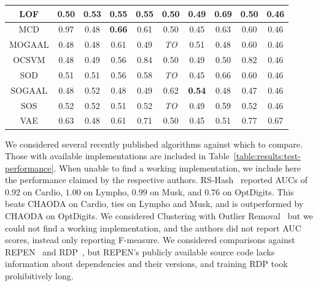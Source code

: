 \begin{table}[!t]
\begin{center}
\begin{small}
\begin{sc}
\begin{tabular}{|c|c|c|c|c|c|c|c|c|c|}
\hline
LOF            &          0.50 &               0.53 &          0.55 &              0.55 &          0.50 &          0.49 &            0.69 &          0.50 &          0.46 \\
\hline
MCD            &          0.97 &               0.48 & \textbf{0.66} &              0.61 &          0.50 &          0.45 &            0.63 &          0.60 &          0.46 \\
\hline
MOGAAL         &          0.48 &               0.48 &          0.61 &              0.49 &   \textit{TO} &          0.51 &            0.48 &          0.60 &          0.46 \\
\hline
OCSVM          &          0.48 &               0.49 &          0.56 &              0.84 &          0.50 &          0.49 &            0.50 &          0.82 &          0.46 \\
\hline
SOD            &          0.51 &               0.51 &          0.56 &              0.58 &   \textit{TO} &          0.45 &            0.66 &          0.60 &          0.46 \\
\hline
SOGAAL         &          0.48 &               0.52 &          0.48 &              0.49 &          0.62 & \textbf{0.54} &            0.48 &          0.47 &          0.46 \\
\hline
SOS            &          0.52 &               0.52 &          0.51 &              0.52 &   \textit{TO} &          0.49 &            0.59 &          0.52 &          0.46 \\
\hline
VAE            &          0.63 &               0.48 &          0.61 &              0.71 &          0.50 &          0.45 &            0.51 &          0.77 &          0.67 \\
\hline
\end{tabular}
\end{sc}
\end{small}
\end{center}
\vskip -0.1in
\end{table}

We considered several recently published algorithms against which to compare.
Those with available implementations are included in Table~\ref{table:results:test-performance}.
When unable to find a working implementation, we include here the performance claimed by the respective authors.
RS-Hash~\cite{sathe2016subspace} reported AUCs of $0.92$ on Cardio, $1.00$ on Lympho, $0.99$ on Musk, and $0.76$ on OptDigits.
This beats CHAODA on Cardio, ties on Lympho and Musk, and is outperformed by CHAODA on OptDigits.
We considered Clustering with Outlier Removal~\cite{liu2019clustering} but we could not find a working implementation, and the authors did not report AUC scores, instead only reporting F-measure.
We considered comparisons against REPEN~\cite{pang2018learning} and RDP~\cite{wang2019unsupervised}, but REPEN's publicly available source code lacks information about dependencies and their versions, and training RDP took prohibitively long.


